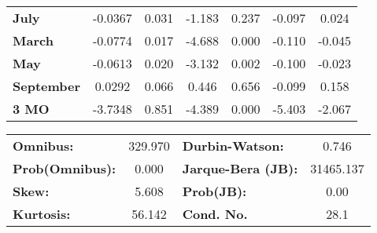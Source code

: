\begin{center}
\begin{tabular}{lcccccc}
\textbf{July}      &      -0.0367  &        0.031     &    -1.183  &         0.237        &       -0.097    &        0.024     \\
\textbf{March}     &      -0.0774  &        0.017     &    -4.688  &         0.000        &       -0.110    &       -0.045     \\
\textbf{May}       &      -0.0613  &        0.020     &    -3.132  &         0.002        &       -0.100    &       -0.023     \\
\textbf{September} &       0.0292  &        0.066     &     0.446  &         0.656        &       -0.099    &        0.158     \\
\textbf{3 MO}      &      -3.7348  &        0.851     &    -4.389  &         0.000        &       -5.403    &       -2.067     \\
\bottomrule
\end{tabular}
\begin{tabular}{lclc}
\textbf{Omnibus:}       & 329.970 & \textbf{  Durbin-Watson:     } &     0.746  \\
\textbf{Prob(Omnibus):} &   0.000 & \textbf{  Jarque-Bera (JB):  } & 31465.137  \\
\textbf{Skew:}          &   5.608 & \textbf{  Prob(JB):          } &      0.00  \\
\textbf{Kurtosis:}      &  56.142 & \textbf{  Cond. No.          } &      28.1  \\
\bottomrule
\end{tabular}
\end{center}

